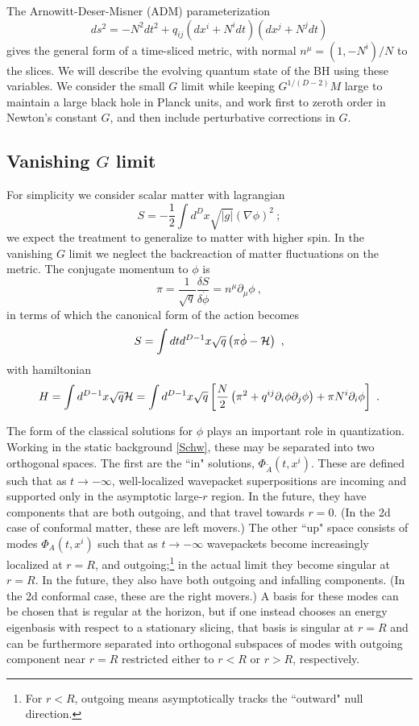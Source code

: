 \documentclass[12pt]{article}
\numberwithin{equation}{section}
\newcommand{\calh}{{\cal H}}
\newcommand{\beq}{\begin{equation}}
\newcommand{\eeq}{\end{equation}}
\newcommand{\hf}{\frac{1}{2}}
\begin{document}
The Arnowitt-Deser-Misner (ADM) parameterization\cite{ADM}
\beq
ds^2= -N^2 dt^2 + q_{ij}(dx^i + N^i dt)(dx^j + N^j dt)
\eeq
gives the general form of a time-sliced metric, with normal $n^\mu=(1,-N^i)/N$ to the slices.  We will describe the evolving quantum state of the BH using these variables.  We consider  the small $G$ limit while keeping $G^{1/(D-2)}M$ large to maintain a large black hole in Planck units,
and work first to zeroth order in Newton's constant $G$, and then include perturbative corrections in $G$.


\subsection{Vanishing $G$ limit}
\label{Gez}

 For simplicity we consider scalar matter with lagrangian
\beq
S=-\hf \int d^D x \sqrt{|g|} (\nabla\phi)^2 \ ;
\eeq
we expect the treatment to generalize to matter with higher spin.  In the vanishing $G$ limit we neglect the backreaction of matter fluctuations on the metric.  The conjugate momentum to $\phi$ is 
\beq
\pi= \frac{1}{\sqrt q}\frac{\delta S}{\delta \dot\phi} =  n^\mu\partial_\mu \phi\ ,
\eeq
in terms of which the canonical form of the action becomes
\beq
S=\int dt d^{D-1}x \sqrt q \left(\pi \dot\phi  - \calh\right)\ ,
\eeq
with hamiltonian
\beq\label{matH}
H =  \int d^{D-1} x \sqrt q \calh= \int d^{D-1} x \sqrt q \left[ \frac{N}{2}\left(\pi^2+q^{ij}\partial_i\phi \partial_j\phi\right) + \pi N^i \partial_i\phi \right] \ .
\eeq 

The form of the classical solutions for $\phi$ plays an important role in  quantization.  Working in the static background \eqref{Schw}, these may be separated into two orthogonal spaces\cite{GiPe1}.  The first are the ``in" solutions, $\Phi_{\tilde A}(t,x^i)$.  These are defined such that as $t\rightarrow-\infty$, well-localized wavepacket superpositions 
are incoming and supported only in the asymptotic large-$r$ region.  In the future, they have components that are both outgoing, and that travel towards $r=0$.  (In the 2d case of conformal matter, these are left movers.)  The other ``up" space consists of modes $\Phi_A(t,x^i)$ such that as $t\rightarrow-\infty$ wavepackets become increasingly localized at $r=R$, and outgoing;\footnote{For $r<R$, outgoing means asymptotically tracks the ``outward" null direction.} in the actual limit they become singular at $r=R$.  In the future, they also have both outgoing and infalling components.  (In the 2d conformal case, these are the right movers.)  A basis for these modes can be chosen that is regular at the horizon, but if one instead chooses an energy eigenbasis with respect to a stationary slicing, that basis is singular at $r=R$ and can be furthermore separated into orthogonal subspaces of modes with outgoing component near $r=R$ restricted either to $r<R$ or $r>R$, respectively\cite{GiPe1}.
\end{document}

